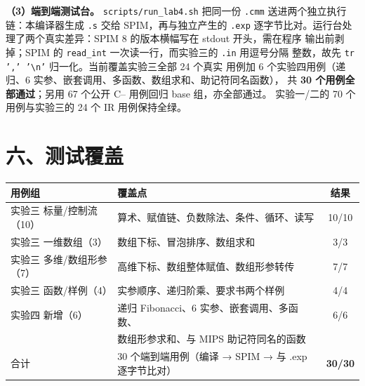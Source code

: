 \documentclass[11pt,a4paper]{ctexart}
\newcommand{\code}[1]{\texttt{#1}}
\begin{document}
\textbf{（3）端到端测试台。} \code{scripts/run\_lab4.sh} 把同一份 \code{.cmm}
送进两个独立执行链：本编译器生成 \code{.s} 交给 SPIM，再与独立产生的 \code{.exp}
逐字节比对。运行台处理了两个真实差异：SPIM 8 的版本横幅写在 stdout 开头，需在程序
输出前剥掉；SPIM 的 \code{read\_int} 一次读一行，而实验三的 \code{.in} 用逗号分隔
整数，故先 \code{tr ',' '\textbackslash n'} 归一化。当前覆盖实验三全部 24 个真实
用例加 6 个实验四用例（递归、6 实参、嵌套调用、多函数、数组求和、助记符同名函数），
共 \textbf{30 个用例全部通过}；另用 67 个公开 C-- 用例回归 base 组，亦全部通过。
实验一/二的 70 个用例与实验三的 24 个 IR 用例保持全绿。

\section*{六、测试覆盖}

{\normalsize
\setlength{\parindent}{0pt}
\begin{tabular}{@{}llc@{}}
\hline
\textbf{用例组} & \textbf{覆盖点} & \textbf{结果} \\
\hline
实验三 标量/控制流（10） & 算术、赋值链、负数除法、条件、循环、读写 & 10/10 \\
实验三 一维数组（3） & 数组下标、冒泡排序、数组求和 & 3/3 \\
实验三 多维/数组形参（7） & 高维下标、数组整体赋值、数组形参转传 & 7/7 \\
实验三 函数/样例（4） & 实参顺序、递归阶乘、要求书两个样例 & 4/4 \\
实验四 新增（6） & 递归 Fibonacci、6 实参、嵌套调用、多函数、 & 6/6 \\
                    & 数组形参求和、与 MIPS 助记符同名的函数 & \\
\hline
合计 & 30 个端到端用例（编译 → SPIM → 与 .exp 逐字节比对） & \textbf{30/30} \\
\hline
\end{tabular}}
\end{document}
